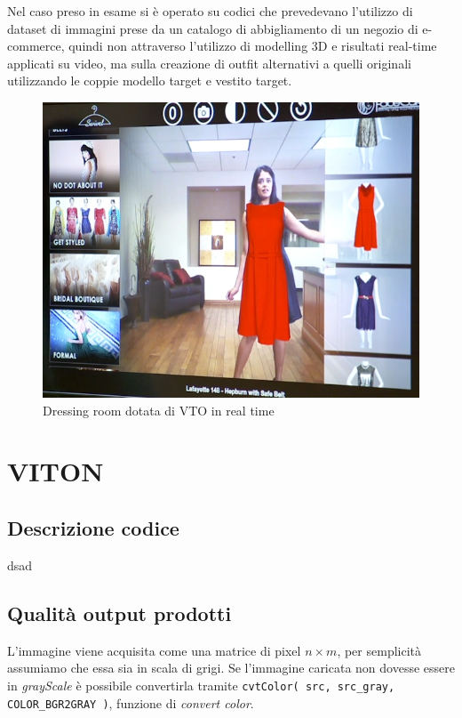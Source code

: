 \documentclass[final, 11pt]{article}
\begin{document}
	Nel caso preso in esame si è operato su codici che prevedevano l'utilizzo di dataset di immagini prese da
un catalogo di abbigliamento di un negozio di e-commerce, quindi non attraverso l'utilizzo di modelling 3D e risultati real-time applicati su video, ma sulla creazione di outfit alternativi a quelli originali utilizzando le coppie modello target e vestito target.
	
	\begin{figure}[!htb]
		\begin{center}
			\includegraphics[scale=.7]{FaceCake-virtual-dressing-room.jpg}
		\end{center} \caption{Dressing room dotata di VTO in real time}
	\end{figure} 

	\section{VITON}
	\subsection{Descrizione codice}
	dsad
	\subsection{Qualità output prodotti}	
	L'immagine viene acquisita come una matrice di pixel $ n \times m $, per semplicità assumiamo che essa sia in scala di grigi. Se l'immagine caricata non dovesse essere in \textit{grayScale} è possibile convertirla tramite \texttt{cvtColor( src, src\_gray, COLOR\_BGR2GRAY )}, funzione di \textit{convert color}.
	
\end{document}

